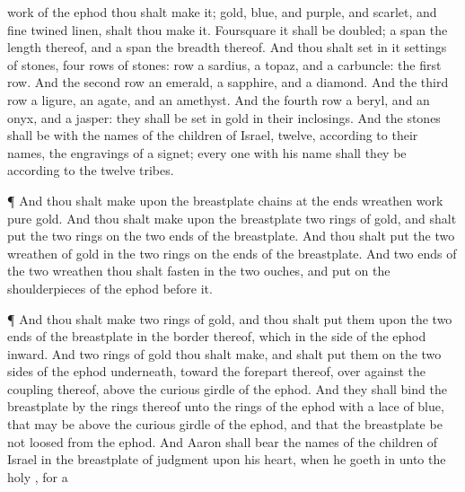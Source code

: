 {work of the
ephod thou shalt
make it;
{}
gold,
{}
blue, and
{}
purple, and
{}
scarlet, and
{} fine
twined
linen, shalt thou
make it.
Foursquare it shall be
{}
doubled; a
span
{} the
length thereof, and a
span
{} the
breadth thereof.
And thou shalt
set in it
settings of
stones,
{}
four
rows of
stones:
{}
row
{} a
sardius, a
topaz, and a
carbuncle:
{} the
first
row.
And the
second
row
{} an
emerald, a
sapphire, and a
diamond.
And the
third
row a
ligure, an
agate, and an
amethyst.
And the
fourth
row a
beryl, and an
onyx, and a
jasper: they shall be
set in
gold in their
inclosings.
And the
stones shall be with the
names of the
children of
Israel,
twelve, according to their
names,
{} the
engravings of a
signet; every
one with his
name shall they be according to the
twelve
tribes.
\par }{\PP {}¶ And thou shalt
make upon the
breastplate
chains at the
ends
{}
wreathen
work
{}
pure
gold.
And thou shalt
make upon the
breastplate
two
rings of
gold, and shalt
put the
two
rings on the
two
ends of the
breastplate.
And thou shalt
put the
two
wreathen
{} of
gold in the
two
rings
{} on the
ends of the
breastplate.
And
{}
two
ends of the
two
wreathen
{} thou shalt
fasten in the
two
ouches, and
put
{} on the
shoulderpieces of the
ephod
before
it.
\par }{\PP {}¶ And thou shalt
make
two
rings of
gold, and thou shalt
put them upon the
two
ends of the
breastplate in the
border thereof, which
{} in the
side of the
ephod
inward.
And
two
{}
rings of
gold thou shalt
make, and shalt
put them on the
two
sides of the
ephod
underneath,
toward the
forepart thereof, over
against the
{}
coupling thereof,
above the curious
girdle of the
ephod.
And they shall
bind the
breastplate by the
rings thereof unto the
rings of the
ephod with a
lace of
blue, that
{} may be above the curious
girdle of the
ephod, and that the
breastplate be not
loosed from the
ephod.
And
Aaron shall
bear the
names of the
children of
Israel in the
breastplate of
judgment upon his
heart, when he
goeth in unto the
holy
{}, for a
}
